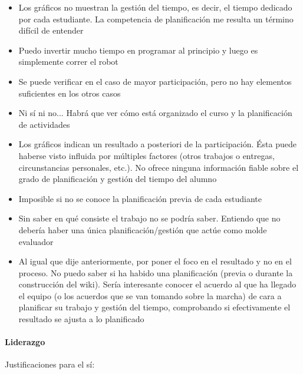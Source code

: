 \begin{itemize}
\item Los gráficos no muestran la gestión del tiempo, es decir, el tiempo dedicado por cada estudiante. La competencia de planificación me resulta un término difícil de entender
\item Puedo invertir mucho tiempo en programar al principio y luego es simplemente correr el robot
\item Se puede verificar en el caso de mayor participación, pero no hay elementos suficientes en los otros casos
\item Ni sí ni no... Habrá que ver cómo está organizado el curso y la planificación de actividades
\item Los gráficos indican un resultado a posteriori de la participación. Ésta puede haberse visto influida por múltiples factores (otros trabajos o entregas, circunstancias personales, etc.). No ofrece ninguna información fiable sobre el grado de planificación y gestión del tiempo del alumno
\item Imposible si no se conoce la planificación previa de cada estudiante
\item Sin saber en qué consiste el trabajo no se podría saber. Entiendo que no debería haber una única planificación/gestión que actúe como molde evaluador
\item Al igual que dije anteriormente, por poner el foco en el resultado y no en el proceso. No puedo saber si ha habido una planificación (previa o durante la construcción del wiki). Sería interesante conocer el acuerdo al que ha llegado el equipo (o los acuerdos que se van tomando sobre la marcha) de cara a planificar su trabajo y gestión del tiempo, comprobando si efectivamente el resultado se ajusta a lo planificado
\end{itemize}

\paragraph*{Liderazgo}

Justificaciones para el sí:

